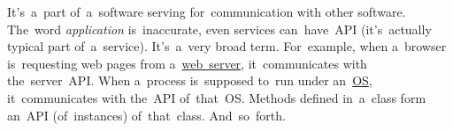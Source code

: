 \label{api}
It's~a~part of~a~software serving for~communication with other software.
The~word \textit{application} is~inaccurate, even services can~have~API (it's~actually typical part of~a~service).
It's~a~very broad term.
For~example, when a~browser is~requesting web pages from a~\hyperref[webserver]{web~server}, it~communicates with the~server~API\@.
When a~process is~supposed to~run under an~\hyperref[os]{OS}, it~communicates with the~API of~that~OS\@.
Methods defined in~a~class form an~API (of~instances) of~that~class.
And~so~forth.
